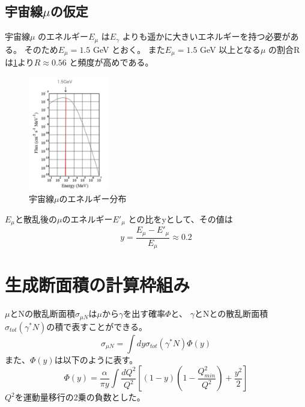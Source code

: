 \subsection{宇宙線$\mu$の仮定}
宇宙線$\mu$ のエネルギー$E_\mu$ は$E_\gamma$ よりも遥かに大きいエネルギーを持つ必要がある。
そのため$E_\mu = 1.5$ GeV とおく。
また$E_\mu = 1.5$ GeV 以上となる$\mu$ の割合Rは\ref{fig:sigma2}より$R \approx 0.56$ と頻度が高めである。
\begin{figure}[H]
    \centering
    \includegraphics[height=5cm]{img/cosimic_ray_energy_distribution.png}
    \caption{宇宙線$\mu$のエネルギー分布 \cite{cosmic_ray}}
    \label{fig:sigma2}
\end{figure}
$E_\mu$と散乱後の$\mu$のエネルギー$E'_\mu$ との比をyとして、その値は
\begin{equation}
    y = \dfrac{E_\mu - E'_\mu}{E_\mu} \approx 0.2
\end{equation}

\section{生成断面積の計算枠組み}
$\mu$とNの散乱断面積$\sigma_{\mu N}$は$\mu$から$\gamma$を出す確率$\Phi$と、
$\gamma$とNとの散乱断面積$\sigma_{tot}(\gamma^* N)$の積で表すことができる。
\begin{equation}
    \sigma_{\mu N} =\int dy  \sigma_{tot}(\gamma^* N) \Phi(y)
\end{equation}
また、$\Phi(y)$は以下のように表す。
\begin{equation}
    \Phi(y) = \dfrac{\alpha}{\pi y} \int \dfrac{dQ^2}{Q^2} [(1-y)(1 - \dfrac{Q^2_{min}}{Q^2}) + \dfrac{y^2}{2}]
\end{equation}
$Q^2$を運動量移行の2乗の負数とした。

